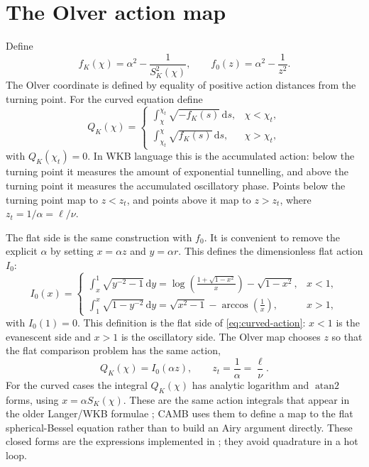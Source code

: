 \documentclass[11pt,a4paper]{article}
\newcommand{\dd}{\mathrm{d}}
\newcommand{\code}[1]{\texttt{\detokenize{#1}}}
\newcommand{\SK}{S_K}
\newcommand{\atanTwo}{\operatorname{atan2}}
\begin{document}
\section{The Olver action map}

Define
\begin{equation}
  f_K(\chi)=\alpha^2-\frac{1}{\SK^2(\chi)},\qquad
  f_0(z)=\alpha^2-\frac{1}{z^2}.
\end{equation}
The Olver coordinate is defined by equality of positive action distances from
the turning point.  For the curved equation define
\begin{equation}
  Q_K(\chi)=
  \begin{cases}
  \displaystyle
  \int_\chi^{\chi_t}\sqrt{-f_K(s)}\,\dd s, & \chi<\chi_t,\\[1.5ex]
  \displaystyle
  \int_{\chi_t}^{\chi}\sqrt{f_K(s)}\,\dd s, & \chi>\chi_t,
  \end{cases}
  \label{eq:curved-action}
\end{equation}
with \(Q_K(\chi_t)=0\).  In WKB language this is the accumulated action: below
the turning point it measures the amount of exponential tunnelling, and above
the turning point it measures the accumulated oscillatory phase.  Points below
the turning point map to \(z<z_t\), and points above it map to \(z>z_t\), where
\(z_t=1/\alpha=\ell/\nu\).

The flat side is the same construction with \(f_0\).  It is convenient to remove
the explicit \(\alpha\) by setting \(x=\alpha z\) and \(y=\alpha r\).  This
defines the dimensionless flat action \(I_0\):
\begin{equation}
  I_0(x)=
  \begin{cases}
  \displaystyle
  \int_x^1\sqrt{y^{-2}-1}\,\dd y
  =\log\left(\frac{1+\sqrt{1-x^2}}{x}\right)-\sqrt{1-x^2}, & x<1,\\[1.5ex]
  \displaystyle
  \int_1^x\sqrt{1-y^{-2}}\,\dd y
  =\sqrt{x^2-1}-\arccos\left(\frac{1}{x}\right), & x>1,
  \end{cases}
  \label{eq:flat-action}
\end{equation}
with \(I_0(1)=0\).  This definition is the flat side of
\eqref{eq:curved-action}: \(x<1\) is the evanescent side and \(x>1\) is the
oscillatory side.  The Olver map chooses \(z\) so that the flat comparison
problem has the same action,
\begin{equation}
  Q_K(\chi)=I_0(\alpha z),
  \qquad z_t=\frac{1}{\alpha}=\frac{\ell}{\nu}.
  \label{eq:action-map}
\end{equation}
For the curved cases the integral \(Q_K(\chi)\)
has analytic logarithm and \(\atanTwo\) forms, using
\(x=\alpha\SK(\chi)\).  These are the same action integrals that appear in the
older Langer/WKB formulae \cite{kosowsky1998,tram2013}; CAMB uses them to define
a map to the flat spherical-Bessel equation rather than to build an Airy
argument directly.  These closed forms are the expressions implemented in
\code{qintegral_exact}; they avoid quadrature in a hot loop.
\end{document}
